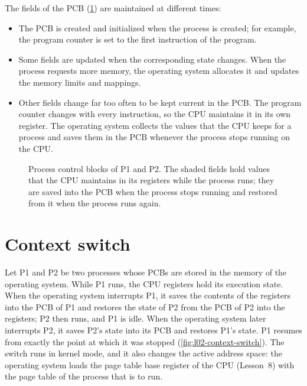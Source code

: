 \documentclass[../main.tex]{subfiles}
\begin{document}
The fields of the PCB (\cref{fig:l02-pcb}) are maintained at different
times:
\begin{itemize}

  \item The PCB is created and initialized when the process is created; for
    example, the program counter is set to the first instruction of the
    program.
  \item Some fields are updated when the corresponding state changes.  When
    the process requests more memory, the operating system allocates it and
    updates the memory limits and mappings.
  \item Other fields change far too often to be kept current in the PCB.
    The program counter changes with every instruction, so the CPU maintains
    it in its own register.  The operating system collects the values that
    the CPU keeps for a process and saves them in the PCB whenever the
    process stops running on the CPU.
\end{itemize}

\begin{figure}[htbp]
  \centering
  
  \caption{Process control blocks of P1 and P2.  The shaded fields hold
    values that the CPU maintains in its registers while the process runs;
    they are saved into the PCB when the process stops running and restored
    from it when the process runs again.}
  \label{fig:l02-pcb}
\end{figure}

\section{Context switch}
\label{sec:l02-context-switch}

Let P1 and P2 be two processes whose PCBs are stored in the memory of
the operating system.  While P1 runs, the CPU registers hold its execution state.  When
the operating system interrupts P1, it saves the contents of the registers
into the PCB of P1 and restores the state of P2 from the PCB of P2 into the
registers; P2 then runs, and P1 is idle.  When the operating system later
interrupts P2, it saves P2's state into its PCB and restores P1's state.
P1 resumes from exactly the point at which it was stopped
(\cref{fig:l02-context-switch}).  The switch runs in kernel mode, and it
also changes the active address space: the operating system loads the
page table base register of the CPU (Lesson~8) with the page table of the process that
is to run.
\end{document}
